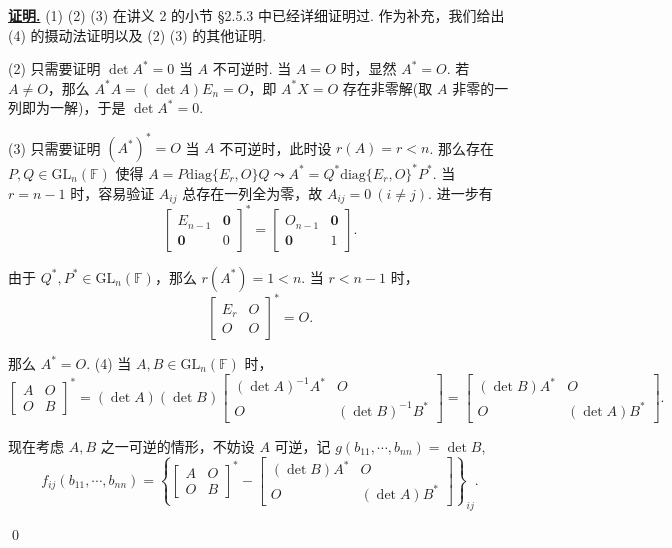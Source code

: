 \documentclass[10pt,openany]{article}
\theoremstyle{thmstyle} %
\theoremstyle{defstyle} %
\theoremstyle{prostyle} %
\theoremstyle{exastyle}
\theoremstyle{remstyle}
\renewenvironment{proof}[1][证明]{\par\underline{\textbf{#1.}} \;\fangsong}{\qed\par}
\newcommand{\gfn}{\text{GL}_n(\mathbb{F})}
\newcommand{\diag}{\mathrm{diag}}
\begin{document}
\begin{proof}
	(1) (2) (3) 在讲义 2 的小节 \S 2.5.3 中已经详细证明过. 作为补充，我们给出 (4) 的摄动法证明以及 (2) (3) 的其他证明.
	
	(2) 只需要证明 \( \det A^*=0 \) 当 \( A \) 不可逆时. 当 \( A=O \) 时，显然 \( A^*=O \). 若 \( A \neq O \)，那么 \( A^*A=(\det A)E_n=O \)，即 \( A^*X=O \) 存在非零解(取 \( A \) 非零的一列即为一解)，于是 \( \det A^*=0 \).
	
	(3) 只需要证明 \( (A^*)^*=O \) 当 \( A \) 不可逆时，此时设 \( r(A)=r<n \). 那么存在 \( P,Q \in \gfn \) 使得 \( A=P\diag\{E_r,O\}Q \leadsto A^*=Q^* \diag\{E_r,O\}^* P^* \). 当 \( r=n-1 \) 时，容易验证 \( A_{ij} \) 总存在一列全为零，故 \( A_{ij}=0 \ (i \neq j) \). 进一步有
	\[ \begin{bmatrix}
		E_{n-1} & \bm{0} \\
		\bm{0} & 0
	\end{bmatrix}^*=\begin{bmatrix}
	    O_{n-1} & \bm{0} \\
	    \bm{0} & 1  
	\end{bmatrix}. \]
	
	 由于 \( Q^*,P^* \in \gfn \)，那么 \( r(A^*)=1<n \). 当 \( r<n-1 \) 时，
	\[ \begin{bmatrix}
		E_r & O \\
		O & O
	\end{bmatrix}^*=O. \]
	
	那么 \( A^*=O \). (4) 当 \( A,B \in \gfn \) 时，
	\[ \begin{bmatrix}
		A & O \\
		O & B
	\end{bmatrix}^*=(\det A)(\det B) \begin{bmatrix}
	(\det A)^{-1} A^* & O \\
	O & (\det B)^{-1} B^*
	\end{bmatrix}= \begin{bmatrix}
	(\det B)A^* & O \\
	O & (\det A)B^*
	\end{bmatrix}. \]
	
	现在考虑 \( A,B \) 之一可逆的情形，不妨设 \( A \) 可逆，记 \( g(b_{11},\cdots,b_{nn})=\det B \),
	\[  f_{ij}(b_{11},\cdots,b_{nn})=\left\{ \begin{bmatrix}
		A & O \\
		O & B
	\end{bmatrix}^*-\begin{bmatrix}
		(\det B)A^* & O \\
		O & (\det A)B^*
	\end{bmatrix}\right\}_{ij}.  \] 


\end{proof}
\end{document}
